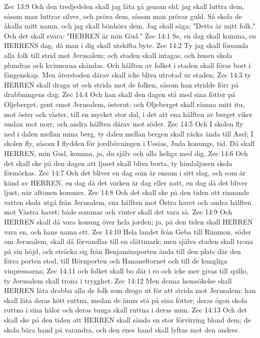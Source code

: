 Zec 13:9  Och den tredjedelen skall jag låta gå genom eld; jag skall luttra dem, såsom man luttrar silver, och pröva dem, såsom man prövar guld. Så skola de åkalla mitt namn, och jag skall bönhöra dem. Jag skall säga: "Detta är mitt folk." Och det skall svara: "HERREN är min Gud."
Zec 14:1  Se, en dag skall komma, en HERRENS dag, då man i dig skall utskifta byte.
Zec 14:2  Ty jag skall församla alla folk till strid mot Jerusalem; och staden skall intagas, och husen skola plundras och kvinnorna skändas. Och hälften av folket i staden skall föras bort i fångenskap. Men återstoden därav skall icke bliva utrotad ur staden;
Zec 14:3  ty HERREN skall draga ut och strida mot de folken, såsom han stridde förr på drabbningens dag.
Zec 14:4  Och han skall den dagen stå med sina fötter på Oljeberget, gent emot Jerusalem, österut; och Oljeberget skall rämna mitt itu, mot öster och väster, till en mycket stor dal, i det att ena hälften av berget viker undan mot norr, och andra hälften därav mot söder.
Zec 14:5  Och I skolen fly ned i dalen mellan mina berg, ty dalen mellan bergen skall räcka ända till Asel; I skolen fly, såsom I flydden för jordbävningen i Ussias, Juda konungs, tid. Då skall HERREN, min Gud, komma, ja, du själv och alla heliga med dig.
Zec 14:6  Och det skall ske på den dagen att ljuset skall bliva borta, ty himlaljusen skola förmörkas.
Zec 14:7  Och det bliver en dag som är ensam i sitt slag, och som är känd av HERREN, en dag då det varken är dag eller natt, en dag då det bliver ljust, när aftonen kommer.
Zec 14:8  Och det skall ske på den tiden att rinnande vatten skola utgå från Jerusalem, ena hälften mot Östra havet och andra hälften mot Västra havet; både sommar och vinter skall det vara så.
Zec 14:9  Och HERREN skall då vara konung över hela jorden; ja, på den tiden skall HERREN vara en, och hans namn ett.
Zec 14:10  Hela landet från Geba till Rimmon, söder om Jerusalem, skall då förvandlas till en slättmark; men själva staden skall trona på sin höjd, och sträcka sig från Benjaminsporten ända till den plats där den förra porten stod, till Hörnporten och Hananeltornet och till de kungliga vinpressarna;
Zec 14:11  och folket skall bo där i ro och icke mer givas till spillo, ty Jerusalem skall trona i trygghet.
Zec 14:12  Men denna hemsökelse skall HERREN låta drabba alla de folk som drogo ut för att strida mot Jerusalem: han skall låta deras kött ruttna, medan de ännu stå på sina fötter; deras ögon skola ruttna i sina hålor och deras tunga skall ruttna i deras mun.
Zec 14:13  Och det skall ske på den tiden att HERREN skall sända en stor förvirring bland dem; de skola bära hand på varandra, och den enes hand skall lyftas mot den andres.
